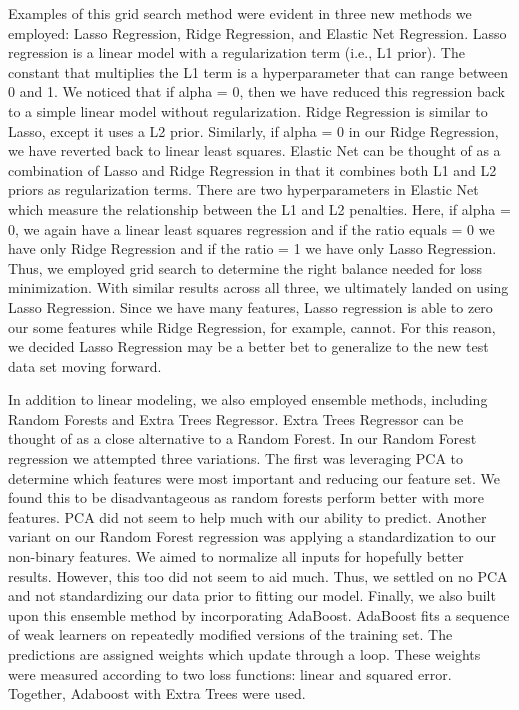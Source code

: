 \documentclass[11pt, oneside]{article}   	%
\begin{document}
Examples of this grid search method were evident in three new methods we employed: Lasso Regression, Ridge Regression, and Elastic Net Regression. Lasso regression is a linear model with a regularization term (i.e., L1 prior). The constant that multiplies the L1 term is a hyperparameter that can range between 0 and 1. We noticed that if alpha = 0, then we have reduced this regression back to a simple linear model without regularization. Ridge Regression is similar to Lasso, except it uses a L2 prior. Similarly, if alpha = 0 in our Ridge Regression, we have reverted back to linear least squares. Elastic Net can be thought of as a combination of Lasso and Ridge Regression in that it combines both L1 and L2 priors as regularization terms. There are two hyperparameters in Elastic Net which measure the relationship between the L1 and L2 penalties. Here, if alpha = 0, we again have a linear least squares regression and if the ratio equals = 0 we have only Ridge Regression and if the ratio = 1 we have only Lasso Regression. Thus, we employed grid search to determine the right balance needed for loss minimization. With similar results across all three, we ultimately landed on using Lasso Regression. Since we have many features, Lasso regression is able to zero our some features while Ridge Regression, for example, cannot. For this reason, we decided Lasso Regression may be a better bet to generalize to the new test data set moving forward. 

In addition to linear modeling, we also employed ensemble methods, including Random Forests and  Extra Trees Regressor. Extra Trees Regressor can be thought of as a close alternative to a Random Forest. In our Random Forest regression we attempted three variations. The first was leveraging PCA to determine which features were most important and reducing our feature set. We found this to be disadvantageous as random forests perform better with more features. PCA did not seem to help much with our ability to predict. Another variant on our Random Forest regression was applying a standardization to our non-binary features. We aimed to normalize all inputs for hopefully better results. However, this too did not seem to aid much. Thus, we settled on no PCA and not standardizing our data prior to fitting our model. Finally, we also built upon this ensemble method by incorporating AdaBoost. AdaBoost fits a sequence of weak learners on repeatedly modified versions of the training set. The predictions are assigned weights which update through a loop. These weights were measured according to two loss functions: linear and squared error. Together, Adaboost with Extra Trees were used.
\end{document}
